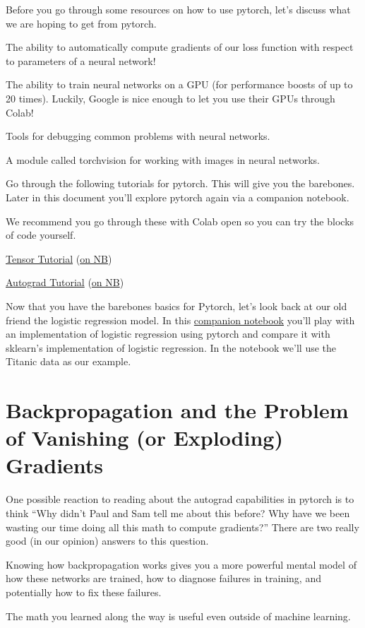 \documentclass[assignment07_Solutions]{subfiles}
\begin{document}
Before you go through some resources on how to use pytorch, let's discuss what we are hoping to get from pytorch.
\bi
\item The ability to automatically compute gradients of our loss function with respect to parameters of a neural network!
\item The ability to train neural networks on a GPU (for performance boosts of up to 20 times).  Luckily, Google is nice enough to let you use their GPUs through Colab!
\item Tools for debugging common problems with neural networks.
\item A module called torchvision for working with images in neural networks.
\ei

Go through the following tutorials for pytorch.  This will give you the barebones.  Later in this document you'll explore pytorch again via a companion notebook.
\begin{externalresources}[(15 minutes)]
We recommend you go through these with Colab open so you can try the blocks of code yourself.
\bi
\item \href{https://pytorch.org/tutorials/beginner/blitz/tensor_tutorial.html}{Tensor Tutorial} (\href{http://nb.mit.edu/f/55481}{on NB})
\item \href{https://pytorch.org/tutorials/beginner/blitz/autograd_tutorial.html}{Autograd Tutorial} (\href{http://nb.mit.edu/f/55482}{on NB})
\ei
\end{externalresources}

\begin{externalresources}[(60 minutes)]
Now that you have the barebones basics for Pytorch, let's look back at our old friend the logistic regression model.  In this \href{https://colab.research.google.com/github/mlfa19/assignments/blob/master/Module\%201/07/Assignment_07_Companion_Pytorch_Titanic.ipynb}{companion notebook} you'll play with an implementation of logistic regression using pytorch and compare it with sklearn's implementation of logistic regression.  In the notebook we'll use the Titanic data as our example.
\end{externalresources}


\section{Backpropagation and the Problem of Vanishing (or Exploding) Gradients}
One possible reaction to reading about the autograd capabilities in pytorch is to think ``Why didn't Paul and Sam tell me about this before?  Why have we been wasting our time doing all this math to compute gradients?''  There are two really good (in our opinion) answers to this question.
\be
\item Knowing how backpropagation works gives you a more powerful mental model of how these networks are trained, how to diagnose failures in training, and potentially how to fix these failures.
\item The math you learned along the way is useful even outside of machine learning.
\ee
\end{document}
